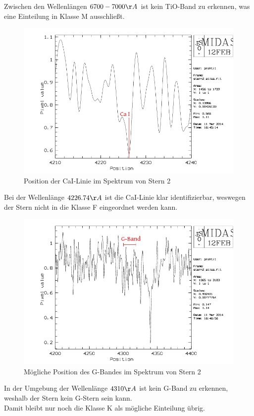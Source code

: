 Zwischen den Wellenlängen $6700-7000 \AA$ ist kein TiO-Band zu erkennen, was eine Einteilung in Klasse M ausschließt.
\\
\begin{figure}
\includegraphics[height=.4\textheight]{images/stern2_CaI.png}
\caption{Position der CaI-Linie im Spektrum von Stern 2}
\label{fig:stern2_CaI}
\end{figure}
Bei der Wellenlänge $4226.74 \AA$ ist die CaI-Linie klar identifizierbar, weswegen der Stern nicht in die Klasse F eingeordnet werden kann.
\\
\begin{figure}
\includegraphics[height=.4\textheight]{images/stern2_G-Band.png}
\caption{Mögliche Position des G-Bandes im Spektrum von Stern 2}
\label{fig:stern2_CaI}
\end{figure}
In der Umgebung der Wellenlänge $4310 \AA$ ist kein G-Band zu erkennen, weshalb der Stern kein G-Stern sein kann.
\\
Damit bleibt nur noch die Klasse K als mögliche Einteilung übrig.

